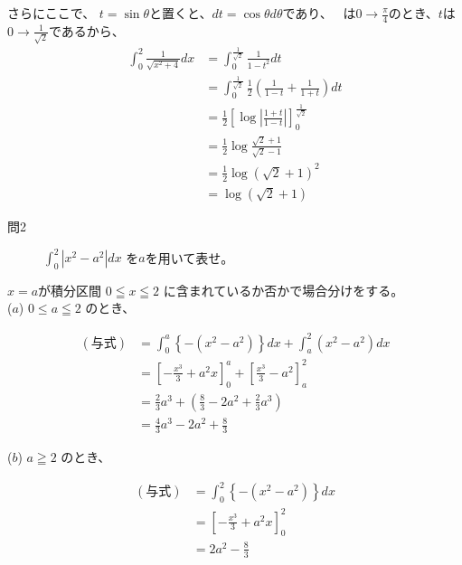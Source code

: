 \documentclass[dvipdfmx,uplatex]{jsarticle}
\begin{document}
さらにここで、
$t = \sin\theta$と置くと、$dt = \cos\theta d\theta$であり、~ \theta は$ \displaystyle 0 \rightarrow \frac{\pi}{4}$のとき、$t$は$\displaystyle 0 \rightarrow \frac{1}{\sqrt{2}}$であるから、\\

\begin{align*}
    \int_0^2 \frac{1}{\sqrt{x^2 + 4}} dx &= \int_0^\frac{1}{\sqrt{2}} \frac{1}{1 - t^2} dt \\
    &= \int_0^\frac{1}{\sqrt{2}} \frac{1}{2}\left(\frac{1}{1 - t} + \frac{1}{1 + t}\right) dt \\
    &= \frac{1}{2} \left[\log\left| \frac{1 + t}{1 - t} \right|\right]_0^\frac{1}{\sqrt{2}} \\
    &= \frac{1}{2}\log\frac{\sqrt{2}+ 1}{\sqrt{2} - 1} \\
    &= \frac{1}{2}\log(\sqrt{2} + 1)^2 \\
    &= \log(\sqrt{2} + 1)
\end{align*}

\newpage

\begin{description}
    \item [問2] $\displaystyle \int_0^2 \left|x^2 - a^2\right| dx$ を$a$を用いて表せ。\\
\end{description}

$x = a$が積分区間 $0 \leqq x \leqq 2$ に含まれているか否かで場合分けをする。\\
($a$) $0 \leq a\leqq 2$ のとき、

\begin{align*}
    (与式) &= \int_0^a \left\{ - (x ^ 2 - a ^ 2)\right\} dx + \int_a^2 (x^2 - a^2) dx \\
    &= \left[-\frac{x^3}{3} + a^2x\right]_0^a + \left[\frac{x^3}{3} - a^2\right]_a^2 \\
    &= \frac{2}{3}a^3 + \left(\frac{8}{3} - 2a^2 + \frac{2}{3}a ^ 3\right) \\
    &= \frac{4}{3}a^3 - 2a^2 + \frac{8}{3}
\end{align*}

($b$)  $a \geqq 2$ のとき、

\begin{align*}
    (与式) &= \int_0^2 \left\{- (x^2 - a^2)\right\} dx \\
    &= \left[ - \frac{x^3}{3} + a^2x\right]_0^2 \\
    &= 2a^2 - \frac{8}{3}
\end{align*}
\end{document}
